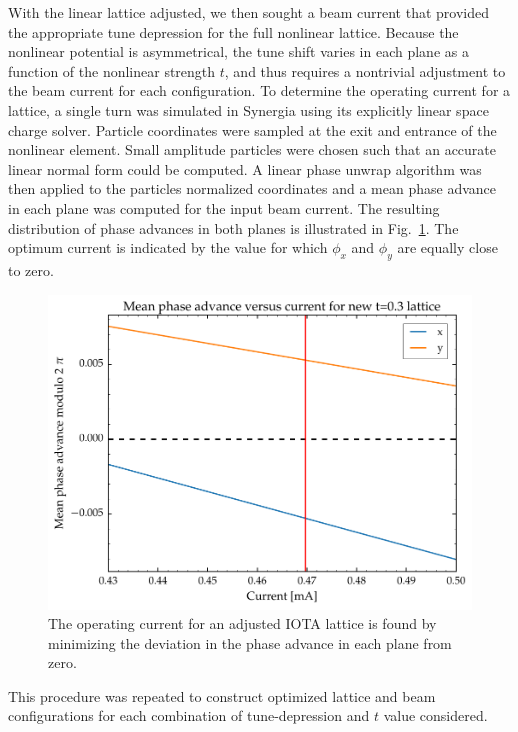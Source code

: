 \documentclass[aps,prstab,twocolumn, groupedaddress]{revtex4-1}
\begin{document}
With the linear lattice adjusted, we then sought a beam current that provided the appropriate tune depression for the full nonlinear lattice. Because the nonlinear potential is asymmetrical, the tune shift varies in each plane as a function of the nonlinear strength $t$, and thus requires a nontrivial adjustment to the beam current for each configuration. To determine the operating current for a lattice, a single turn was simulated in Synergia using its explicitly linear space charge solver. Particle coordinates were sampled at the exit and entrance of the nonlinear element. Small amplitude particles were chosen such that an accurate linear normal form could be computed. A linear phase unwrap algorithm was then applied to the particles normalized coordinates and a mean phase advance in each plane was computed for the input beam current. The resulting distribution of phase advances in both planes is illustrated in Fig.~\ref{fig:phase_adjust}. The optimum current is indicated by the value for which $\phi_x$ and $\phi_y$ are equally close to zero.

\begin{figure}
	\includegraphics[width=\columnwidth]{adjusted_t0pt3phase.pdf}%
	\caption{\label{fig:phase_adjust} The operating current for an adjusted IOTA lattice is found by minimizing the deviation in the phase advance in each plane from zero.}
\end{figure}

This procedure was repeated to construct optimized lattice and beam configurations for each combination of tune-depression and $t$ value considered.


\end{document}
